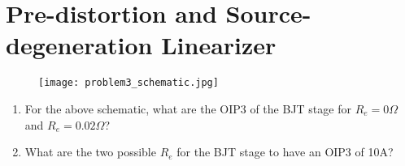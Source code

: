 \section{Pre-distortion and Source-degeneration Linearizer}
\begin{figure}[H]
    \centering \texttt{[image: problem3\_schematic.jpg]}
\end{figure}

\begin{enumerate}[label=(\alph*)]
    \item {\color{blue} For the above schematic, what are the OIP3 of the BJT stage for $R_e = 0 \Omega$ and $R_e = 0.02 \Omega$?}

    \item {\color{blue} What are the two possible $R_e$ for the BJT stage to have an OIP3 of 10A?}
\end{enumerate}


